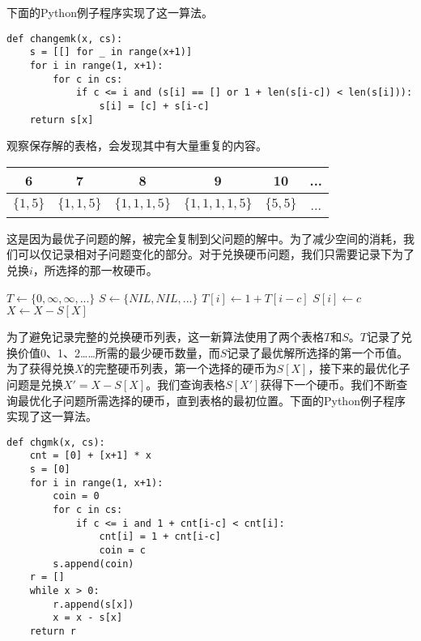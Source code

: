 \documentclass[UTF8]{article}
\begin{document}
下面的Python例子程序实现了这一算法。

\lstset{language=Python}
\begin{lstlisting}
def changemk(x, cs):
    s = [[] for _ in range(x+1)]
    for i in range(1, x+1):
        for c in cs:
            if c <= i and (s[i] == [] or 1 + len(s[i-c]) < len(s[i])):
                s[i] = [c] + s[i-c]
    return s[x]
\end{lstlisting}

观察保存解的表格，会发现其中有大量重复的内容。

\begin{tabular}{|c|c|c|c|c|c|}
\hline
6 & 7 & 8 & 9 & 10 & ... \\
\hline
$\{ 1, 5 \}$ & $\{1, 1, 5\}$ & $\{1, 1, 1, 5\}$ & $\{1, 1, 1, 1, 5\}$ & $\{ 5, 5 \}$ & ... \\
\hline
\end{tabular}

这是因为最优子问题的解，被完全复制到父问题的解中。为了减少空间的消耗，我们可以仅记录相对子问题变化的部分。对于兑换硬币问题，我们只需要记录下为了兑换$i$，所选择的那一枚硬币。

\begin{algorithmic}[1]
  \State $T \gets \{ 0, \infty, \infty, ... \}$
  \State $S \gets \{ NIL, NIL, ... \}$
        \State $T[i] \gets 1 + T[i-c]$
        \State $S[i] \gets c$
      \EndIf
    \EndFor
  \EndFor
    \State {}
    \State $X \gets X - S[X]$
  \EndWhile
\EndFunction
\end{algorithmic}

为了避免记录完整的兑换硬币列表，这一新算法使用了两个表格$T$和$S$。$T$记录了兑换价值0、1、2……所需的最少硬币数量，而$S$记录了最优解所选择的第一个币值。为了获得兑换$X$的完整硬币列表，第一个选择的硬币为$S[X]$，接下来的最优化子问题是兑换$X' = X - S[X]$。我们查询表格$S[X']$获得下一个硬币。我们不断查询最优化子问题所需选择的硬币，直到表格的最初位置。下面的Python例子程序实现了这一算法。

\lstset{language=Python}
\begin{lstlisting}
def chgmk(x, cs):
    cnt = [0] + [x+1] * x
    s = [0]
    for i in range(1, x+1):
        coin = 0
        for c in cs:
            if c <= i and 1 + cnt[i-c] < cnt[i]:
                cnt[i] = 1 + cnt[i-c]
                coin = c
        s.append(coin)
    r = []
    while x > 0:
        r.append(s[x])
        x = x - s[x]
    return r
\end{lstlisting}
\end{document}
